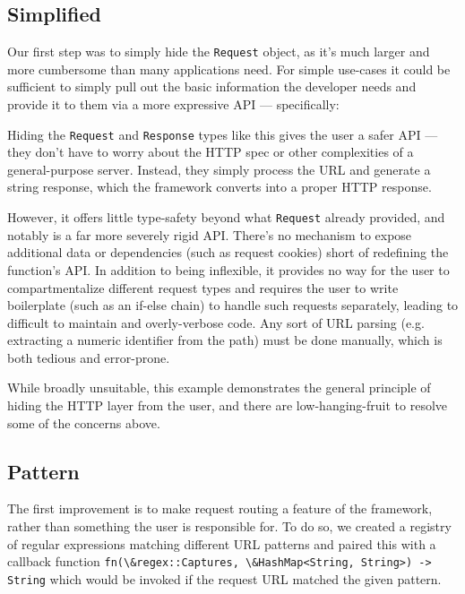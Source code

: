 \documentclass[sigconf]{acmart}
\def\code#1{\lstinline{#1}}
\begin{document}
\subsection{Simplified}

Our first step was to simply hide the \code{Request} object, as it's much larger and more cumbersome than many applications need. For simple use-cases it could be sufficient to simply pull out the basic information the developer needs and provide it to them via a more expressive API --- specifically:

\begin{minipage}{\linewidth}

\end{minipage}

Hiding the \code{Request} and \code{Response} types like this gives the user a safer API --- they don't have to worry about the HTTP spec or other complexities of a general-purpose server. Instead, they simply process the URL and generate a string response, which the framework converts into a proper HTTP response.

However, it offers little type-safety beyond what \code{Request} already provided, and notably is a far more severely rigid API. There's no mechanism to expose additional data or dependencies (such as request cookies) short of redefining the function's API. In addition to being inflexible, it provides no way for the user to compartmentalize different request types and requires the user to write boilerplate (such as an if-else chain) to handle such requests separately, leading to difficult to maintain and overly-verbose code. Any sort of URL parsing (e.g. extracting a numeric identifier from the path) must be done manually, which is both tedious and error-prone.

While broadly unsuitable, this example demonstrates the general principle of hiding the HTTP layer from the user, and there are low-hanging-fruit to resolve some of the concerns above.

\subsection{Pattern}

The first improvement is to make request routing a feature of the framework, rather than something the user is responsible for. To do so, we created a registry of regular expressions matching different URL patterns and paired this with a callback function \code{fn(\&regex::Captures, \&HashMap<String, String>) -> String} which would be invoked if the request URL matched the given pattern.
\end{document}
